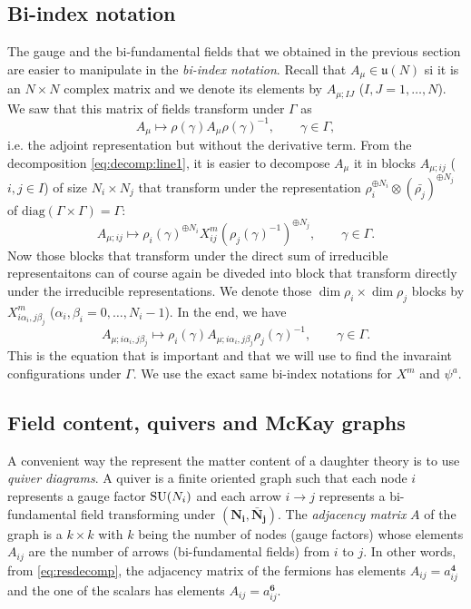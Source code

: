     \subsection{Bi-index notation}

        The gauge and the bi-fundamental fields that we obtained in the previous section are easier to manipulate in the \emph{bi-index notation}. Recall that $A_\mu\in\mathfrak{u}(N)$ si it is an $N\times N$ complex matrix and we denote its elements by $A_{\mu;IJ}$ ($I,J=1,\dots,N$). We saw that this matrix of fields transform under $\Gamma$ as
        \begin{equation}
            A_\mu\mapsto \rho(\gamma)A_\mu \rho(\gamma)^{-1},\qquad \gamma\in \Gamma,
        \end{equation}
        i.e. the adjoint representation but without the derivative term. From the decomposition \eqref{eq:decomp:line1}, it is easier to decompose $A_\mu$ it in blocks $A_{\mu;ij}$ ($i,j\in I$) of size $N_i\times N_j$ that transform under the representation $\rho^{\oplus N_i}_i\otimes(\bar{\rho_j})^{\oplus N_j}$ of $\text{diag}(\Gamma\times\Gamma)=\Gamma$:
        \begin{equation}
            A_{\mu;ij}\mapsto \rho_i(\gamma)^{\oplus N_i}X^m_{ij}(\rho_j(\gamma)^{-1})^{\oplus N_j},\qquad \gamma\in\Gamma.
        \end{equation}
        Now those blocks that transform under the direct sum of irreducible representaitons can of course again be diveded into block that transform directly under the irreducible representations. We denote those $\dim\rho_i\times\dim\rho_j$ blocks by $X^m_{i\alpha_i,j\beta_j}$ ($\alpha_i,\beta_i=0,\dots,N_i-1$). In the end, we have
        \begin{equation}
            \boxed{A_{\mu;i\alpha_i,j\beta_j}\mapsto\rho_i(\gamma)A_{\mu;i\alpha_i,j\beta_j}\rho_j(\gamma)^{-1},\qquad \gamma\in\Gamma.}
        \end{equation}
        This is the equation that is important and that we will use to find the invaraint configurations under $\Gamma$. We use the exact same bi-index notations for $X^m$ and $\psi^a$.

    \subsection{Field content, quivers and McKay graphs}

        A convenient way the represent the matter content of a daughter theory is to use \emph{quiver diagrams}. A quiver is a finite oriented graph such that each node $i$ represents a gauge factor $\text{SU}(N_i)$ and each arrow $i\to j$ represents a bi-fundamental field transforming under $(\boldsymbol{\textbf{N}_i},\boldsymbol{\bar{\textbf{N}}_j})$. The \emph{adjacency matrix} $A$ of the graph is a $k\times k$ with $k$ being the number of nodes (gauge factors) whose elements $A_{ij}$ are the number of arrows (bi-fundamental fields) from $i$ to $j$. In other words, from \eqref{eq:resdecomp}, the adjacency matrix of the fermions has elements $A_{ij}=a^{\boldsymbol{4}}_{ij}$ and the one of the scalars has elements $A_{ij}=a^{\boldsymbol{6}}_{ij}$.

